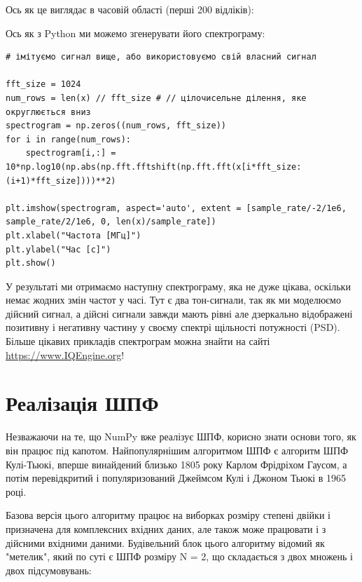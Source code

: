 Ось як це виглядає в часовій області (перші 200 відліків):

\href{../_images/spectrogram_time.svg}{}

Ось як з Python ми можемо згенерувати його спектрограму:

\begin{Verbatim}[breaklines=true,breakanywhere=true,fontsize=\small]
# імітуємо сигнал вище, або використовуємо свій власний сигнал

fft_size = 1024
num_rows = len(x) // fft_size # // цілочисельне ділення, яке округлюється вниз
spectrogram = np.zeros((num_rows, fft_size))
for i in range(num_rows):
    spectrogram[i,:] = 10*np.log10(np.abs(np.fft.fftshift(np.fft.fft(x[i*fft_size:(i+1)*fft_size])))**2)

plt.imshow(spectrogram, aspect='auto', extent = [sample_rate/-2/1e6, sample_rate/2/1e6, 0, len(x)/sample_rate])
plt.xlabel("Частота [МГц]")
plt.ylabel("Час [с]")
plt.show()
\end{Verbatim}

У результаті ми отримаємо наступну спектрограму, яка не дуже цікава,
оскільки немає жодних змін частот у часі. Тут є два тон-сигнали, так як
ми моделюємо дійсний сигнал, а дійсні сигнали завжди мають рівні але
дзеркально відображені позитивну і негативну частину у своєму спектрі
щільності потужності (PSD). Більше цікавих прикладів спектрограм можна
знайти на сайті \url{https://www.IQEngine.org}!

\href{../_images/spectrogram.svg}{}

\section{Реалізація
ШПФ}\label{ux440ux435ux430ux43bux456ux437ux430ux446ux456ux44f-ux448ux43fux444}

Незважаючи на те, що NumPy вже реалізує ШПФ, корисно знати основи того,
як він працює під капотом. Найпопулярнішим алгоритмом ШПФ є алгоритм ШПФ
Кулі-Тьюкі, вперше винайдений близько 1805 року Карлом Фрідріхом Гаусом,
а потім перевідкритий і популяризований Джеймсом Кулі і Джоном Тьюкі в
1965 році.

Базова версія цього алгоритму працює на виборках розміру степені двійки
і призначена для комплексних вхідних даних, але також може працювати і з
дійсними вхідними даними. Будівельний блок цього алгоритму відомий як
"метелик", який по суті є ШПФ розміру N = 2, що складається з двох
множень і двох підсумовувань:

